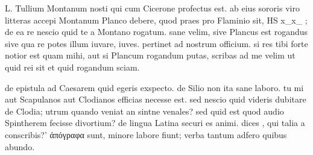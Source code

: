 


 L. Tullium Montanum nosti qui cum Cicerone profectus est. ab eius sororis viro litteras accepi Montanum Planco debere, quod praes pro Flaminio sit, HS x_x_ ; de ea re nescio quid te a Montano rogatum. sane velim, sive Plancus est rogandus sive qua re potes illum iuvare, iuves. pertinet ad nostrum officium. si res tibi forte notior est quam mihi, aut si Plancum rogandum putas, scribas ad me velim ut quid rei sit et quid rogandum sciam.

 de epistula ad Caesarem quid egeris exspecto. de Silio non ita sane laboro. tu mi aut Scapulanos aut Clodianos efficias necesse est. sed nescio quid videris dubitare de Clodia; utrum quando veniat an sintne venales? sed quid est quod audio Spintherem fecisse divortium? de lingua Latina securi es animi. dices , qui talia a conscribis?' ἀπόγραφα sunt, minore labore fiunt; verba tantum adfero quibus abundo.
